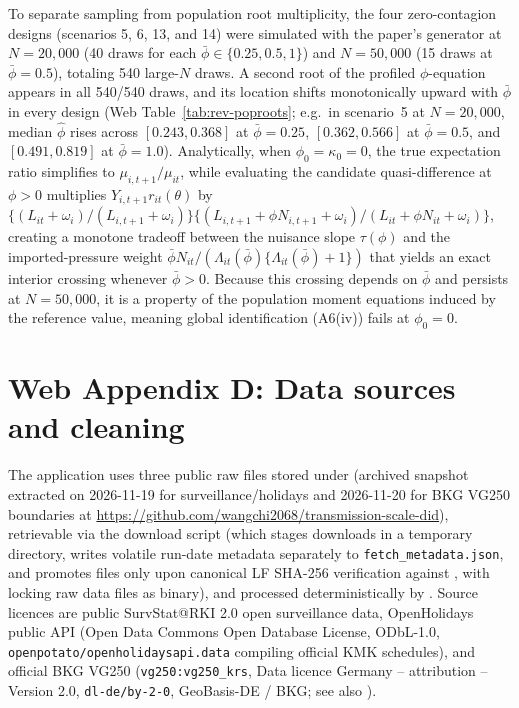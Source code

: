 To separate sampling from population root multiplicity, the four zero-contagion designs (scenarios 5,
6, 13, and 14) were simulated with the paper's generator at $N=20{,}000$ (40 draws for each
$\bar\phi\in\{0.25,0.5,1\}$) and $N=50{,}000$ (15 draws at $\bar\phi=0.5$), totaling 540 large-$N$
draws. A second root of the profiled $\phi$-equation appears in all 540/540 draws, and its
location shifts monotonically upward with $\bar\phi$ in every design (Web Table~\ref{tab:rev-poproots};
e.g.\ in scenario~5 at $N=20{,}000$, median $\hat\phi$ rises across $[0.243,0.368]$ at $\bar\phi=0.25$,
$[0.362,0.566]$ at $\bar\phi=0.5$, and $[0.491,0.819]$ at $\bar\phi=1.0$). Analytically, when
$\phi_0=\kappa_0=0$, the true expectation ratio simplifies to $\mu_{i,t+1}/\mu_{it}$, while
evaluating the candidate quasi-difference at $\phi>0$ multiplies $Y_{i,t+1}r_{it}(\theta)$ by
$\{(L_{it}+\omega_i)/(L_{i,t+1}+\omega_i)\}\{(L_{i,t+1}+\phi N_{i,t+1}+\omega_i)/(L_{it}+\phi N_{it}+\omega_i)\}$,
creating a monotone tradeoff between the nuisance slope $\tau(\phi)$ and the imported-pressure
weight $\bar\phi N_{it}/(\Lambda_{it}(\bar\phi)\{\Lambda_{it}(\bar\phi)+1\})$ that yields an
exact interior crossing whenever $\bar\phi>0$. Because this crossing depends on $\bar\phi$ and persists
at $N=50{,}000$, it is a property of the population moment equations induced by the reference value,
meaning global identification (A6(iv)) fails at $\phi_0=0$.

\section*{Web Appendix D: Data sources and cleaning}
\label{app:data}

The application uses three public raw files stored under 
(archived snapshot extracted on 2026-11-19 for surveillance/holidays and 2026-11-20 for BKG VG250
boundaries at \url{https://github.com/wangchi2068/transmission-scale-did}), retrievable via the
download script  (which stages downloads in a temporary
directory, writes volatile run-date metadata separately to \texttt{fetch\_metadata.json}, and
promotes files only upon canonical LF SHA-256 verification against ,
with  locking raw data files as binary), and processed deterministically by
. Source licences are public SurvStat@RKI 2.0 open surveillance
data, OpenHolidays public API (Open Data Commons Open Database License, ODbL-1.0,
\texttt{openpotato/openholidaysapi.data} compiling official KMK schedules), and official BKG VG250
(\texttt{vg250:vg250\_krs}, Data licence Germany -- attribution -- Version 2.0,
\texttt{dl-de/by-2-0}, \textcopyright{} GeoBasis-DE / BKG; see also
).

